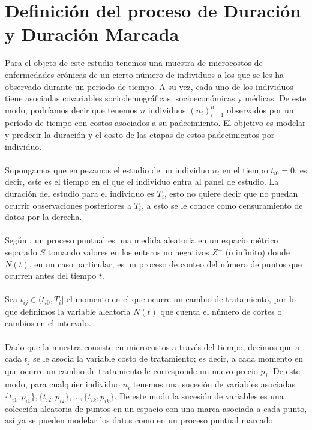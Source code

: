 \section{Definici\'on del proceso de Duraci\'on y Duraci\'on Marcada}
Para el objeto de este estudio tenemos una muestra de microcostos de enfermedades cr\'onicas de un cierto n\'umero de individuos a los que se les ha observado durante un per\'iodo de tiempo. A su vez, cada uno de los individuos tiene asociadas covariables sociodemogr\'aficas, socioecon\'omicas y m\'edicas. De este modo, podr\'iamos decir que tenemos $n$ individuos $(n_i)_{i=1}^n$ observados por un per\'iodo de tiempo con costos asociados a su padecimiento. El objetivo es modelar y predecir la duraci\'on y el costo de las etapas de estos padecimientos por individuo.\\ 
\\
Supongamos que empezamos el estudio de un individuo $n_i$ en el tiempo $t_{i0}=0$, es decir, este es el tiempo en el que el individuo entra al panel de estudio. La duraci\'on del estudio para el individuo es $T_i$, esto no quiere decir que no puedan ocurrir observaciones posteriores a $T_i$, a esto se le conoce como censuramiento de datos por la derecha.\\
\\
Seg\'un \cite{intropp}, un proceso puntual es una medida aleatoria en un espacio m\'etrico separado $S$ tomando valores en los enteros no negativos $Z^+$ (o infinito) donde $N(t)$, en un caso particular, es un proceso de conteo del n\'umero de puntos que ocurren antes del tiempo $t$.\\
\\
Sea $t_{ij} \in (t_{i0},T_i]$ el momento en el que ocurre un cambio de tratamiento, por lo que definimos la variable aleatoria $N(t)$ que cuenta el n\'umero de cortes o cambios en el intervalo.\\
\\
Dado que la muestra consiste en microcostos a trav\'es del tiempo, decimos que a cada $t_j$ se le asocia la variable costo de tratamiento; es decir, a cada momento en que ocurre un cambio de tratamiento le corresponde un nuevo precio $p_j$. De este modo, para cualquier individuo $n_i$ tenemos una sucesi\'on de variables asociadas $\{t_{i1},p_{i1}\},\{t_{i2},p_{i2}\},...,\{t_{ik},p_{ik}\}$. De este modo la sucesi\'on de variables es una colecci\'on aleatoria de puntos en un espacio con una marca asociada a cada punto, as\'i ya se pueden modelar los datos como en un proceso puntual marcado.\\
